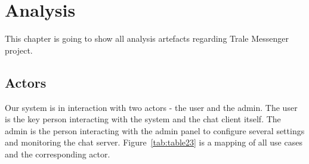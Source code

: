 \chapter{Analysis}\label{ch:analysis}

This chapter is going to show all analysis artefacts regarding Trale Messenger project.

\section{Actors}\label{sec:actors}

Our system is in interaction with two actors - the user and the admin.
The user is the key person interacting with the system and the chat client itself.
The admin is the person interacting with the admin panel to configure several settings and monitoring the chat server.
Figure~\ref{tab:table23} is a mapping of all use cases and the corresponding actor.

